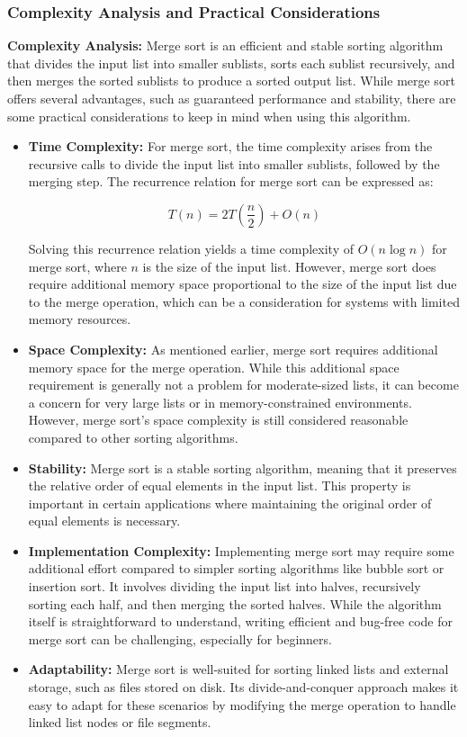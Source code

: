 \documentclass[12pt]{book} %
\begin{document}
\subsubsection{Complexity Analysis and Practical Considerations}
\textbf{Complexity Analysis:}
Merge sort is an efficient and stable sorting algorithm that divides the input list into smaller sublists, sorts each sublist recursively, and then merges the sorted sublists to produce a sorted output list. While merge sort offers several advantages, such as guaranteed performance and stability, there are some practical considerations to keep in mind when using this algorithm.
\begin{itemize}
    \item \textbf{Time Complexity:} For merge sort, the time complexity arises from the recursive calls to divide the input list into smaller sublists, followed by the merging step. The recurrence relation for merge sort can be expressed as:

\[ T(n) = 2T\left(\frac{n}{2}\right) + O(n) \]

Solving this recurrence relation yields a time complexity of \( O(n \log n) \) for merge sort, where \( n \) is the size of the input list. However, merge sort does require additional memory space proportional to the size of the input list due to the merge operation, which can be a consideration for systems with limited memory resources.

\item \textbf{Space Complexity:} As mentioned earlier, merge sort requires additional memory space for the merge operation. While this additional space requirement is generally not a problem for moderate-sized lists, it can become a concern for very large lists or in memory-constrained environments. However, merge sort's space complexity is still considered reasonable compared to other sorting algorithms.

\item\textbf{Stability:} Merge sort is a stable sorting algorithm, meaning that it preserves the relative order of equal elements in the input list. This property is important in certain applications where maintaining the original order of equal elements is necessary.

\item \textbf{Implementation Complexity:} Implementing merge sort may require some additional effort compared to simpler sorting algorithms like bubble sort or insertion sort. It involves dividing the input list into halves, recursively sorting each half, and then merging the sorted halves. While the algorithm itself is straightforward to understand, writing efficient and bug-free code for merge sort can be challenging, especially for beginners.

\item \textbf{Adaptability:} Merge sort is well-suited for sorting linked lists and external storage, such as files stored on disk. Its divide-and-conquer approach makes it easy to adapt for these scenarios by modifying the merge operation to handle linked list nodes or file segments.
\end{itemize}
\end{document}
